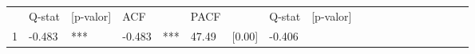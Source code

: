 \documentclass[
]{book}
\theoremstyle{definition}
\theoremstyle{definition}
\theoremstyle{definition}
\theoremstyle{remark}
\begin{document}
\begin{longtable}[]{@{}lllllllllllllllllll@{}}
\begin{minipage}[t]{0.02\columnwidth}
\strut
\end{minipage} & \begin{minipage}[t]{0.03\columnwidth}\raggedright
Q-stat\strut
\end{minipage} & \begin{minipage}[t]{0.05\columnwidth}\raggedright
{[}p-valor{]}\strut
\end{minipage} & \begin{minipage}[t]{0.02\columnwidth}\raggedright
ACF\strut
\end{minipage} & \begin{minipage}[t]{0.01\columnwidth}\raggedright
\strut
\end{minipage} & \begin{minipage}[t]{0.03\columnwidth}\raggedright
PACF\strut
\end{minipage} & \begin{minipage}[t]{0.01\columnwidth}\raggedright
\strut
\end{minipage} & \begin{minipage}[t]{0.03\columnwidth}\raggedright
Q-stat\strut
\end{minipage} & \begin{minipage}[t]{0.05\columnwidth}\raggedright
{[}p-valor{]}\strut
\end{minipage}\tabularnewline
\begin{minipage}[t]{0.05\columnwidth}\raggedright
1\strut
\end{minipage} & \begin{minipage}[t]{0.04\columnwidth}\raggedright
-0.483\strut
\end{minipage} & \begin{minipage}[t]{0.02\columnwidth}\raggedright
***\strut
\end{minipage} & \begin{minipage}[t]{0.03\columnwidth}\raggedright
-0.483\strut
\end{minipage} & \begin{minipage}[t]{0.02\columnwidth}\raggedright
***\strut
\end{minipage} & \begin{minipage}[t]{0.04\columnwidth}\raggedright
47.49\strut
\end{minipage} & \begin{minipage}[t]{0.05\columnwidth}\raggedright
{[}0.00{]}\strut
\end{minipage} & \begin{minipage}[t]{0.04\columnwidth}\raggedright
-0.406\strut
\end{minipage} & \begin{minipage}[t]{0.02\columnwidth}\raggedright

\end{minipage}
\end{longtable}
\end{document}
